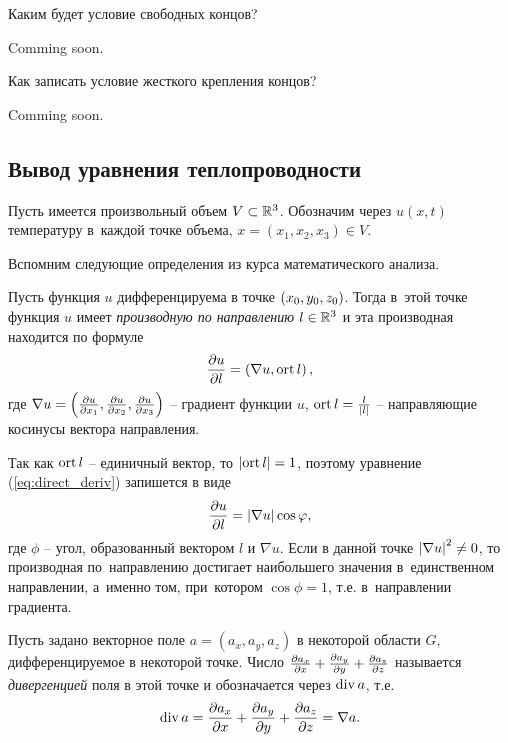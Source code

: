 \begin{task}
	Каким будет условие свободных концов?
\end{task}

\begin{solution}
	Comming soon.
\end{solution}

\begin{task}
	Как записать условие жесткого крепления концов?
\end{task}

\begin{solution}
	Comming soon.
\end{solution}

\subsection{Вывод уравнения теплопроводности}

Пусть имеется произвольный объем $V \subset \mathbb{R}^3$. Обозначим через $u(x,t)$ температуру в~каждой точке объема, $x = (x_1,x_2,x_3) \in V$.

Вспомним следующие определения из курса математического анализа.
\begin{definition}
    Пусть функция $u$ дифференцируема в точке $\\(x_0,y_0,z_0)$. Тогда в~этой точке функция $u$ имеет \emph{производную по направлению} $l \in \mathbb{R}^3$ и эта производная
    находится по формуле
    \begin{equation}\label{eq:direct_deriv}
		\frac{\partial u}{\partial l} = \left( \nabla u, \operatorname{ort} l \right),
	\end{equation}
	где $\nabla{u} = \left( \frac{\partial u}{\partial x_1},\frac{\partial u}{\partial x_2},\frac{\partial u}{\partial x_3} \right)$ -- градиент функции $u$, $\operatorname{ort}{l} = \frac{l}{\left| l \right|}$ -- направляющие косинусы вектора направления.
\end{definition} 

Так как $\operatorname{ort}{l}$ -- единичный вектор, то $\left| \operatorname{ort}{l} \right| = 1$, поэтому уравнение (\ref{eq:direct_deriv}) запишется в виде
\[ \frac{\partial u}{\partial l} = \left| \nabla{u} \right| \cos\varphi, \]
где $\phi$ -- угол, образованный вектором $l$ и $\nabla{u}$. Если в данной точке $\left| \nabla{u} \right|^2 \ne 0$, то производная по~направлению достигает наибольшего значения в~единственном 
направлении, а~именно том, при~котором $\cos\phi = 1$, т.е. в~направлении градиента.

\begin{definition}
	Пусть задано векторное поле $a = (a_x, a_y, a_z)$ в некоторой области $G$, дифференцируемое в некоторой точке.
	Число $\\ \frac{\partial a_x}{\partial x} + \frac{\partial a_y}{\partial y} + \frac{\partial a_z}{\partial z} $ называется \emph{дивергенцией} поля в этой точке и обозначается через $\operatorname{div}{a}$, т.е.
	\[ \operatorname{div}{a} = \frac{\partial a_x}{\partial x} + \frac{\partial a_y}{\partial y} + \frac{\partial a_z}{\partial z} = \nabla{a}. \]
\end{definition}

